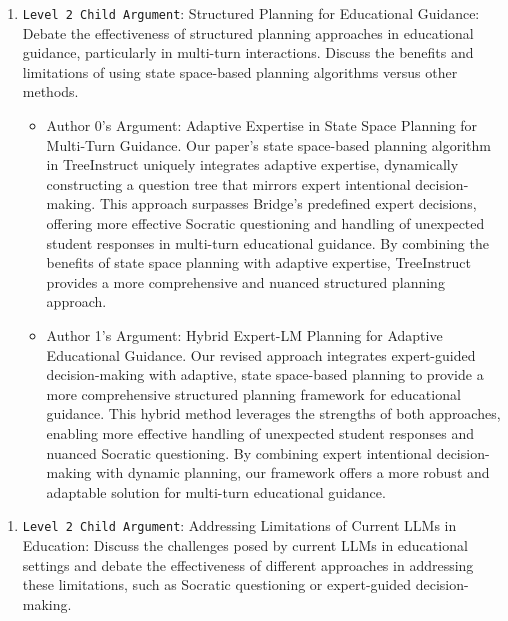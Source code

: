 \begin{enumerate}
    \begin{enumerate}
        \item \texttt{Level 2 Child Argument}: Structured Planning for Educational Guidance: Debate the effectiveness of structured planning approaches in educational guidance, particularly in multi-turn interactions. Discuss the benefits and limitations of using state space-based planning algorithms versus other methods.
        \begin{itemize}
            \item Author 0's Argument: Adaptive Expertise in State Space Planning for Multi-Turn Guidance. Our paper's state space-based planning algorithm in TreeInstruct uniquely integrates adaptive expertise, dynamically constructing a question tree that mirrors expert intentional decision-making. This approach surpasses Bridge's predefined expert decisions, offering more effective Socratic questioning and handling of unexpected student responses in multi-turn educational guidance. By combining the benefits of state space planning with adaptive expertise, TreeInstruct provides a more comprehensive and nuanced structured planning approach.
		\item Author 1's Argument: Hybrid Expert-LM Planning for Adaptive Educational Guidance. Our revised approach integrates expert-guided decision-making with adaptive, state space-based planning to provide a more comprehensive structured planning framework for educational guidance. This hybrid method leverages the strengths of both approaches, enabling more effective handling of unexpected student responses and nuanced Socratic questioning. By combining expert intentional decision-making with dynamic planning, our framework offers a more robust and adaptable solution for multi-turn educational guidance.
        \end{itemize}
    \end{enumerate}

    \begin{enumerate}
        \item \texttt{Level 2 Child Argument}: Addressing Limitations of Current LLMs in Education: Discuss the challenges posed by current LLMs in educational settings and debate the effectiveness of different approaches in addressing these limitations, such as Socratic questioning or expert-guided decision-making.


\end{enumerate}
\end{enumerate}
